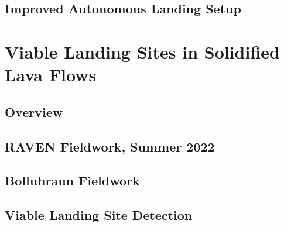 \documentclass[10pt,twoside,b5paper]{book}
\begin{document}
		\section{Improved Autonomous Landing Setup}

	\chapter{Viable Landing Sites in Solidified Lava Flows}
		\section{Overview}
		\section{RAVEN Fieldwork, Summer 2022}
		\section{Bolluhraun Fieldwork}
		\section{Viable Landing Site Detection}

	
	
\end{document}
